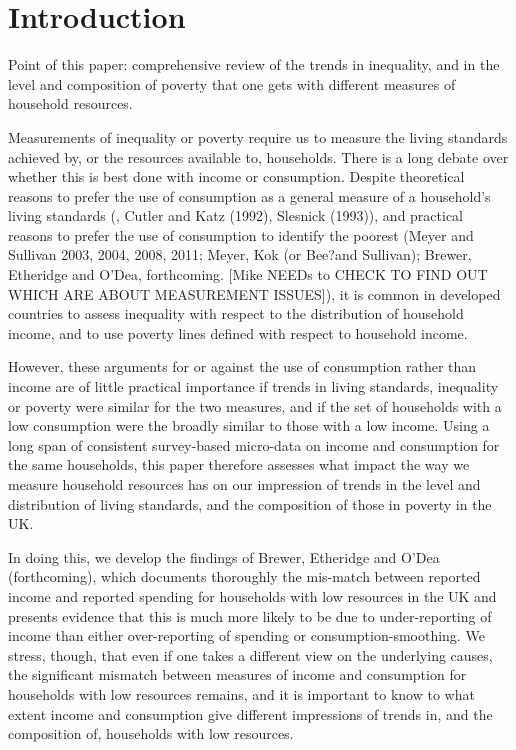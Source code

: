 
\section{Introduction} 

Point of this paper: comprehensive review of the trends in inequality, and in the level and composition of poverty that one gets with different measures of household resources. 

Measurements of inequality or poverty require us to measure the living standards achieved by, or the resources available to, households. There is a long debate over whether this is best done with income or consumption. Despite theoretical reasons to prefer the use of consumption as a general measure of a household's living standards (\cite{Poterba1989}, Cutler and Katz (1992), Slesnick (1993)), and practical reasons to prefer the use of consumption to identify the poorest (Meyer and Sullivan 2003, 2004, 2008, 2011; Meyer, Kok (or Bee?and Sullivan); Brewer, Etheridge and O'Dea, forthcoming. [Mike NEEDs to CHECK TO FIND OUT WHICH ARE ABOUT MEASUREMENT ISSUES]), it is common in developed countries to assess inequality with respect to the distribution of household income, and to use poverty lines defined with respect to household income. 

However, these arguments for or against the use of consumption rather than income are of little practical importance if trends in living standards, inequality or poverty were similar for the two measures, and if the set of households with a low consumption were the broadly similar to those with a low income. Using a long span of consistent survey-based micro-data on income and consumption for the same households, this paper therefore assesses what impact the way we measure household resources has on our impression of trends in the level and distribution of living standards, and the composition of those in poverty in the UK. 

In doing this, we develop the findings of Brewer, Etheridge and O'Dea (forthcoming), which documents thoroughly the mis-match between reported income and reported spending for households with low resources in the UK and presents evidence that this is much more likely to be due to under-reporting of income than either over-reporting of spending or consumption-smoothing. We stress, though, that even if one takes a different view on the underlying causes, the significant mismatch between measures of income and consumption for households with low resources remains, and it is important to know to what extent income and consumption give different impressions of trends in, and the composition of, households with low resources. 

